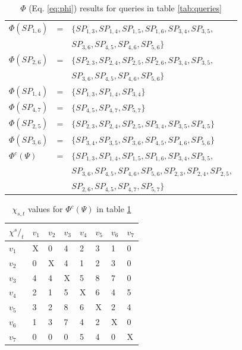 \begin{table}
\begin{tabular}{lcp{}}
$\Phi(SP_{1,6})$ &= 	& $\{SP_{1,3},SP_{1,4},SP_{1,5},SP_{1,6},SP_{3,4},SP_{3,5},$\\
		 &	& $SP_{3,6},SP_{4,5},SP_{4,6},SP_{5,6}\}$ \\
$\Phi(SP_{2,6})$ &=  	& $\{SP_{2,3},SP_{2,4},SP_{2,5},SP_{2,6},SP_{3,4},SP_{3,5},$ \\
		 &	& $SP_{3,6},SP_{4,5},SP_{4,6},SP_{5,6}\}$ \\
$\Phi(SP_{1,4})$ &=  	& $\{SP_{1,3},SP_{1,4},SP_{3,4}\}$ \\
$\Phi(SP_{4,7})$ &=  	& $\{SP_{4,5},SP_{4,7},SP_{5,7}\}$ \\
$\Phi(SP_{2,5})$ &=  	& $\{SP_{2,3},SP_{2,4},SP_{2,5},SP_{3,4},SP_{3,5},SP_{4,5}\}$ \\
$\Phi(SP_{3,6})$ &=  	& $\{SP_{3,4},SP_{3,5},SP_{3,6},SP_{4,5},SP_{4,6},SP_{5,6}\}$ \\\hline
$\Phi^c(\Psi)$ 	 &=  	& $\{SP_{1,3},SP_{1,4},SP_{1,5},SP_{1,6},SP_{3,4},SP_{3,5},$ \\
		 &	& $SP_{3,6},SP_{4,5},SP_{4,6},SP_{5,6},SP_{2,3},SP_{2,4},SP_{2,5},$ \\
		 &	& $SP_{2,6},SP_{4,5},SP_{4,7},SP_{5,7}\}$  \\
\end{tabular}
\caption{$\Phi$ (Eq. \ref{eq:phi}) results for queries in table \ref{tab:queries}}
\label{tab:chi}
\end{table}

\begin{table}
\center
\begin{tabular}{|l||l|l|l|l|l|l|l|}
\textbf{$\chi {^s/_t}$}	& $v_1$	& $v_2$	& $v_3$	& $v_4$	& $v_5$	& $v_6$	& $v_7$ \\\hline
$v_1$			& X	& 0	& 4	& 2	& 3	& 1	& 0	 \\
$v_2$			& 0	& X	& 4	& 1	& 2	& 3	& 0	 \\
$v_3$			& 4	& 4	& X	& 5	& 8	& 7	& 0	 \\
$v_4$			& 2	& 1	& 5	& X	& 6	& 4	& 5	 \\
$v_5$			& 3	& 2	& 8	& 6	& X	& 2	& 4	 \\
$v_6$			& 1	& 3	& 7	& 4	& 2	& X	& 0	 \\
$v_7$			& 0	& 0	& 0	& 5	& 4	& 0	& X	 \\
\end{tabular}
\caption{$\chi_{s,t}$ values for $\Phi^c(\Psi)$ in table \ref{tab:chi}}
\label{tab:freq}
\end{table}



